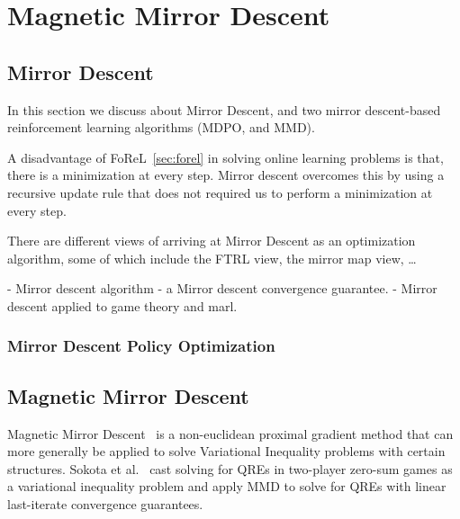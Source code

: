 \chapter{Magnetic Mirror Descent}

\section{Mirror Descent}

In this section we discuss about Mirror Descent, and two mirror descent-based reinforcement
learning algorithms (MDPO, and MMD).

A disadvantage of FoReL~\ref{sec:forel} in solving online learning problems is that, there is a
minimization at every step.
Mirror descent overcomes this by using a recursive update rule that does not required us to perform
a minimization at every step.

There are different views of arriving at Mirror Descent as an optimization algorithm, some of which
include the FTRL view, the mirror map view, \dots

- Mirror descent algorithm -
a Mirror descent convergence guarantee.
- Mirror descent applied to game theory and marl.

\subsection[MDPO]{Mirror
	Descent Policy Optimization}

\section[MMD]{Magnetic Mirror Descent}

Magnetic Mirror Descent~\cite{sokotaUnified2023} is a non-euclidean proximal gradient method that
can more generally be applied to solve Variational Inequality problems with certain structures.
Sokota et al.~\cite{sokotaUnified2023} cast solving for QREs in two-player zero-sum games as a
variational inequality problem and apply MMD to solve for QREs with linear last-iterate convergence
guarantees.

